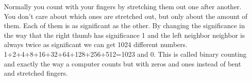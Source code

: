 
Normally you count with your fingers by stretching them out one after another. You don't care about which ones are stretched out, but only about the amount of them. Each of them is as significant as the other. By changing the significance in the way that the right thumb has significance 1 and the left neighbor neighbor is always twice as significant we can get 1024 different numbers. 1+2+4+8+16+32+64+128+256+512=1023 and 0. This is called binary counting and exactly the way a computer counts but with zeros and ones instead of bent and stretched fingers.

